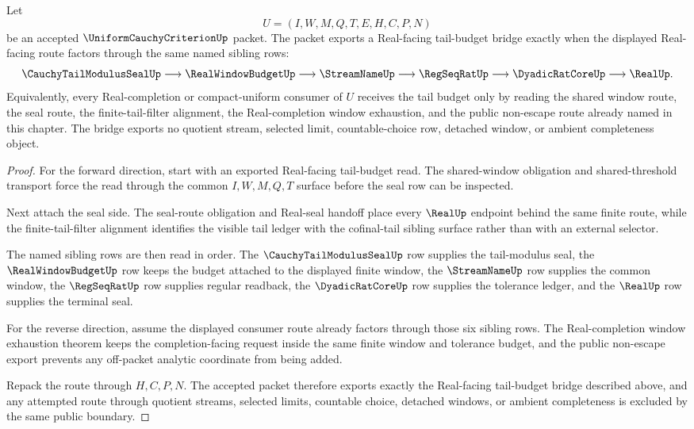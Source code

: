 \begin{theorem}
\label{thm:uniform-cauchy-criterion-tail-budget-bridge}
Let
$$
U=(I,W,M,Q,T,E,H,C,P,N)
$$
be an accepted $\UniformCauchyCriterionUp$ packet. The packet exports a Real-facing tail-budget bridge exactly when the displayed Real-facing route factors through the same named sibling rows:
$$
\CauchyTailModulusSealUp \longrightarrow
\RealWindowBudgetUp \longrightarrow
\StreamNameUp \longrightarrow
\RegSeqRatUp \longrightarrow
\DyadicRatCoreUp \longrightarrow
\RealUp.
$$
Equivalently, every Real-completion or compact-uniform consumer of $U$ receives the tail budget only by reading the shared window route, the seal route, the finite-tail-filter alignment, the Real-completion window exhaustion, and the public non-escape route already named in this chapter. The bridge exports no quotient stream, selected limit, countable-choice row, detached window, or ambient completeness object.
\end{theorem}
\begin{proof}
For the forward direction, start with an exported Real-facing tail-budget read. The shared-window obligation and shared-threshold transport force the read through the common $I,W,M,Q,T$ surface before the seal row can be inspected.

Next attach the seal side. The seal-route obligation and Real-seal handoff place every $\RealUp$ endpoint behind the same finite route, while the finite-tail-filter alignment identifies the visible tail ledger with the cofinal-tail sibling surface rather than with an external selector.

The named sibling rows are then read in order. The $\CauchyTailModulusSealUp$ row supplies the tail-modulus seal, the $\RealWindowBudgetUp$ row keeps the budget attached to the displayed finite window, the $\StreamNameUp$ row supplies the common window, the $\RegSeqRatUp$ row supplies regular readback, the $\DyadicRatCoreUp$ row supplies the tolerance ledger, and the $\RealUp$ row supplies the terminal seal.

For the reverse direction, assume the displayed consumer route already factors through those six sibling rows. The Real-completion window exhaustion theorem keeps the completion-facing request inside the same finite window and tolerance budget, and the public non-escape export prevents any off-packet analytic coordinate from being added.

Repack the route through $H,C,P,N$. The accepted packet therefore exports exactly the Real-facing tail-budget bridge described above, and any attempted route through quotient streams, selected limits, countable choice, detached windows, or ambient completeness is excluded by the same public boundary.
\end{proof}
